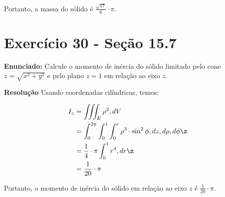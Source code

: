 \documentclass{article}
\begin{document}
Portanto, a massa do sólido é $\frac{\sqrt{17}}{6} \cdot \pi$.

\newpage

\section*{Exercício 30 - Seção 15.7}
\textbf{Enunciado:} Calcule o momento de inércia do sólido limitado pelo cone $z = \sqrt{x^2 + y^2}$ e pelo plano $z = 1$ em relação ao eixo $z$.

\textbf{Resolução} Usando coordenadas cilíndricas, temos:

\begin{align*}
I_z &= \iiint_E \rho^2 , dV \\
&= \int_0^{2\pi}\int_0^1\int_0^{r} \rho^3 \cdot \sin^2 \phi , dz , d\rho , d\phi \z\\
&= \frac{1}{4} \cdot \pi \int_0^1 r^4 , dr \z\\
&= \frac{1}{20} \cdot \pi
\end{align*}

Portanto, o momento de inércia do sólido em relação ao eixo $z$ é $\frac{1}{20} \cdot \pi$.
\end{document}
